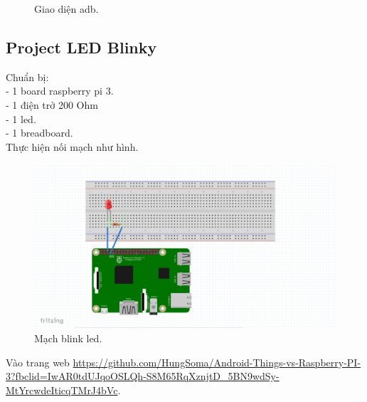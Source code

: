 \begin{enumerate}
\begin{center}
\begin{figure}[htp]
\begin{center}
    \end{center}
    \caption{Giao diện adb.}
    \label{refhinh1}
    \end{figure}
\end{center}
 \end{enumerate}
 
 \subsection{Project LED Blinky}
 Chuẩn bị:\\
 - 1 board raspberry pi 3.\\
 - 1 điện trở 200 Ohm\\
 - 1 led.\\
 - 1 breadboard.\\
 \newline
 Thực hiện nối mạch như hình.
 \begin{center}
    \begin{figure}[htp]
    \begin{center}
     \includegraphics[scale=0.35]{image3/blinkled}
    \end{center}
    \caption{Mạch blink led.}
    \label{refhinh1}
    \end{figure}
\end{center}
\newpage
Vào trang web \url{https://github.com/HungSoma/Android-Things-vs-Raspberry-PI-3?fbclid=IwAR0tdUJqoOSLQh-S8M65RqXznjtD_5BN9wdSy-MtYrcwdeIticqTMrJ4bVc}.\\

